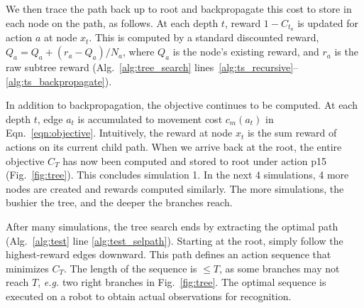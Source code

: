 \documentclass[letterpaper, 10 pt, conference]{ieeeconf}  %
\begin{document}
We then trace the path back up to root and backpropagate this cost to store in each node on the path, as follows.
At each depth $t$, reward $1-C_{t_a}$ is updated for action $a$ at node $x_t$.
This is computed by a standard discounted reward, $Q_a = Q_a + (r_a - Q_a) / N_a$, where $Q_a$ is the node's existing reward, and $r_a$ is the raw subtree reward (Alg.~\ref{alg:tree_search} lines~\ref{alg:ts_recursive}--\ref{alg:ts_backpropagate}).

In addition to backpropagation, the objective continues to be computed. At each depth $t$, edge $a_t$ is accumulated to movement cost $c_m(a_t)$ in Eqn.~\ref{eqn:objective}. Intuitively, the reward at node $x_t$ is the sum reward of actions on its current child path.
When we arrive back at the root, the entire objective $C_T$ has now been computed and stored to root under action p15 (Fig.~\ref{fig:tree}). This concludes simulation 1.
%
In the next 4 simulations, 4 more nodes are created and rewards computed similarly. %
The more simulations, the bushier the tree, and the deeper the branches reach.

After many simulations, the tree search ends by extracting the optimal %
path (Alg.~\ref{alg:test} line \ref{alg:test_selpath}). Starting at the root, simply follow the highest-reward edges downward.
This path defines an action sequence that minimizes $C_T$.
The length of the sequence is $\leq T$, as some branches may not reach $T$, \textit{e.g.} two right branches in Fig.~\ref{fig:tree}.
The optimal sequence is executed on a robot to obtain actual observations for recognition.



\end{document}
